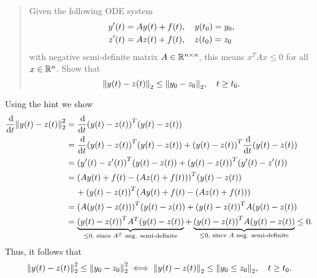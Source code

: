 \documentclass{exercise}
\begin{document}
	\begin{quote}
		Given the following ODE system
		\begin{align*}
			y'\parentheses*{t} &= Ay\parentheses*{t} + f\parentheses*{t}, \quad y\parentheses*{t_0} = y_0,\\
			z'\parentheses*{t} &= Az\parentheses*{t} + f\parentheses*{t}, \quad z\parentheses*{t_0} = z_0
		\end{align*}
		with negative semi-definite matrix \(A \in \mathbb{R}^{n \times n}\), this means \(x^T Ax \le 0\) for all \(x \in \mathbb{R}^n\).
		Show that
		\[
			\norm*{y\parentheses*{t} - z\parentheses*{t}}_2 \le \norm*{y_0 - z_0}_2, \quad t \ge t_0.
		\]
	\end{quote}

	Using the hint we show
	\begin{align*}
		\frac{\d}{\d t}\norm*{y\parentheses*{t} - z\parentheses*{t}}_2^2 &= \frac{\d}{\d t}\parentheses*{y\parentheses*{t} - z\parentheses*{t}}^T \parentheses*{y\parentheses*{t} - z\parentheses*{t}}\\
		&= \frac{\d}{\d t}\parentheses*{y\parentheses*{t} - z\parentheses*{t}}^T\parentheses*{y\parentheses*{t} - z\parentheses*{t}} + \parentheses*{y\parentheses*{t} - z\parentheses*{t}}^T \frac{\d}{\d t}\parentheses*{y\parentheses*{t} - z\parentheses*{t}}\\
		&= \parentheses*{y'\parentheses*{t} - z'\parentheses*{t}}^T \parentheses*{y\parentheses*{t} - z\parentheses*{t}} + \parentheses*{y\parentheses*{t} - z\parentheses*{t}}^T \parentheses*{y'\parentheses*{t} - z'\parentheses*{t}}\\
		&= \parentheses*{Ay\parentheses*{t} + f\parentheses*{t} - \parentheses*{Az\parentheses*{t} + f\parentheses*{t}}}^T \parentheses*{y\parentheses*{t} - z\parentheses*{t}}\\
		&\quad\, + \parentheses*{y\parentheses*{t} - z\parentheses*{t}}^T \parentheses*{Ay\parentheses*{t} + f\parentheses*{t} - \parentheses*{Az\parentheses*{t} + f\parentheses*{t}}}\\
		&= \parentheses*{A\parentheses*{y\parentheses*{t} - z\parentheses*{t}}}^T \parentheses*{y\parentheses*{t} - z\parentheses*{t}} + \parentheses*{y\parentheses*{t} - z\parentheses*{t}}^T A\parentheses*{y\parentheses*{t} - z\parentheses*{t}}\\
		&= \underbrace{\parentheses*{y\parentheses*{t} - z\parentheses*{t}}^T A^T\parentheses*{y\parentheses*{t} - z\parentheses*{t}}}_{\le 0\text{, since }A^T\text{ neg. semi-definite}} + \underbrace{\parentheses*{y\parentheses*{t} - z\parentheses*{t}}^T A\parentheses*{y\parentheses*{t} - z\parentheses*{t}}}_{\le 0\text{, since }A\text{ neg. semi-definite}} \le 0.
	\end{align*}
	Thus, it follows that
	\[
		\norm*{y\parentheses*{t} - z\parentheses*{t}}_2^2 \le \norm*{y_0 - z_0}_2^2 \iff \norm*{y\parentheses*{t} - z\parentheses*{t}}_2 \le \norm*{y_0 \le z_0}_2, \quad t \ge t_0.
	\]
\end{document}
